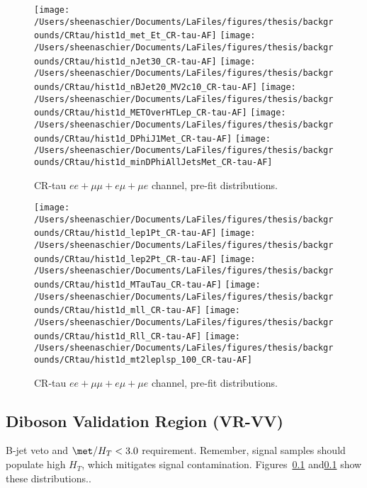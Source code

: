 \begin{figure}
    \centering
        \texttt{[image: /Users/sheenaschier/Documents/LaFiles/figures/thesis/backgrounds/CRtau/hist1d\_met\_Et\_CR-tau-AF]}
        \texttt{[image: /Users/sheenaschier/Documents/LaFiles/figures/thesis/backgrounds/CRtau/hist1d\_nJet30\_CR-tau-AF]}
        \texttt{[image: /Users/sheenaschier/Documents/LaFiles/figures/thesis/backgrounds/CRtau/hist1d\_nBJet20\_MV2c10\_CR-tau-AF]}
        \texttt{[image: /Users/sheenaschier/Documents/LaFiles/figures/thesis/backgrounds/CRtau/hist1d\_METOverHTLep\_CR-tau-AF]}
        \texttt{[image: /Users/sheenaschier/Documents/LaFiles/figures/thesis/backgrounds/CRtau/hist1d\_DPhiJ1Met\_CR-tau-AF]}
        \texttt{[image: /Users/sheenaschier/Documents/LaFiles/figures/thesis/backgrounds/CRtau/hist1d\_minDPhiAllJetsMet\_CR-tau-AF]}
    \caption{CR-tau $ee+\mu\mu +e\mu + \mu e$ channel, pre-fit distributions.}
    \label{fig:CR-tau-1}
\end{figure} 

\begin{figure}
    \centering
        \texttt{[image: /Users/sheenaschier/Documents/LaFiles/figures/thesis/backgrounds/CRtau/hist1d\_lep1Pt\_CR-tau-AF]}
        \texttt{[image: /Users/sheenaschier/Documents/LaFiles/figures/thesis/backgrounds/CRtau/hist1d\_lep2Pt\_CR-tau-AF]}
        \texttt{[image: /Users/sheenaschier/Documents/LaFiles/figures/thesis/backgrounds/CRtau/hist1d\_MTauTau\_CR-tau-AF]}
        \texttt{[image: /Users/sheenaschier/Documents/LaFiles/figures/thesis/backgrounds/CRtau/hist1d\_mll\_CR-tau-AF]}
        \texttt{[image: /Users/sheenaschier/Documents/LaFiles/figures/thesis/backgrounds/CRtau/hist1d\_Rll\_CR-tau-AF]}
        \texttt{[image: /Users/sheenaschier/Documents/LaFiles/figures/thesis/backgrounds/CRtau/hist1d\_mt2leplsp\_100\_CR-tau-AF]}
    \caption{CR-tau $ee+\mu\mu +e\mu + \mu e$ channel, pre-fit distributions.}
    \label{fig:CR-tau-2}
\end{figure} 



\subsection{Diboson Validation Region (VR-VV)}
B-jet veto and $\met/H_T<3.0$ requirement.  Remember, signal samples should populate high $H_T$, which mitigates signal contamination.  Figures~\ref{} and\ref{} show these distributions..

